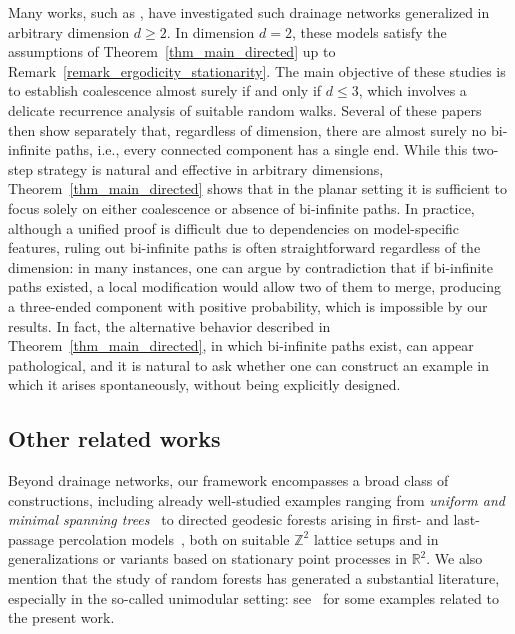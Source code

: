 \documentclass[a4paper, 11pt]{article} %
\theoremstyle{plain}
\newcommand{\R}{\mathbb{R}}
\newcommand{\Z}{\mathbb{Z}}
\newcommand{\1}{\mathds 1}
\numberwithin{equation}{section}
\begin{document}
Many works, such as \cite{coalescence_dicrete_drainage_network, discrete_dsf, poisson_trees, lattice_drainage, dsf_coal_vs_dim}, have investigated such drainage networks generalized in arbitrary dimension $d\geq2$. In dimension $d=2$, these models satisfy the assumptions of Theorem~\ref{thm_main_directed} up to Remark~\ref{remark_ergodicity_stationarity}. The main objective of these studies is to establish coalescence almost surely if and only if $d\leq3$, which involves a delicate recurrence analysis of suitable random walks. Several of these papers then show separately that, regardless of dimension, there are almost surely no bi-infinite paths, i.e., every connected component has a single end. While this two-step strategy is natural and effective in arbitrary dimensions, Theorem~\ref{thm_main_directed} shows that in the planar setting it is sufficient to focus solely on either coalescence or absence of bi-infinite paths. In practice, although a unified proof is difficult due to dependencies on model-specific features, ruling out bi-infinite paths is often straightforward regardless of the dimension: in many instances, one can argue by contradiction that if bi-infinite paths existed, a local modification would allow two of them to merge, producing a three-ended component with positive probability, which is impossible by our results. In fact, the alternative behavior described in Theorem~\ref{thm_main_directed}, in which bi-infinite paths exist, can appear pathological, and it is natural to ask whether one can construct an example in which it arises spontaneously, without being explicitly designed.


\subsection*{Other related works}


Beyond drainage networks, our framework encompasses a broad class of constructions, including already well-studied examples ranging from \emph{uniform and minimal spanning trees}~\cite{uniform_spanning_forest, minimal_spanning_forest} to directed geodesic forests arising in first- and last-passage percolation models~\cite{competition_interface, licea_and_newman, euclidean_fpp}\nocite{coalescence_dsf}, both on suitable $\Z^2$ lattice setups and in generalizations or variants based on stationary point processes in $\R^2$. We also mention that the study of random forests has generated a substantial literature, especially in the so-called unimodular setting: see~\cite{unimodular_classification, unimodular_random_trees} for some examples related to the present work.
\end{document}
